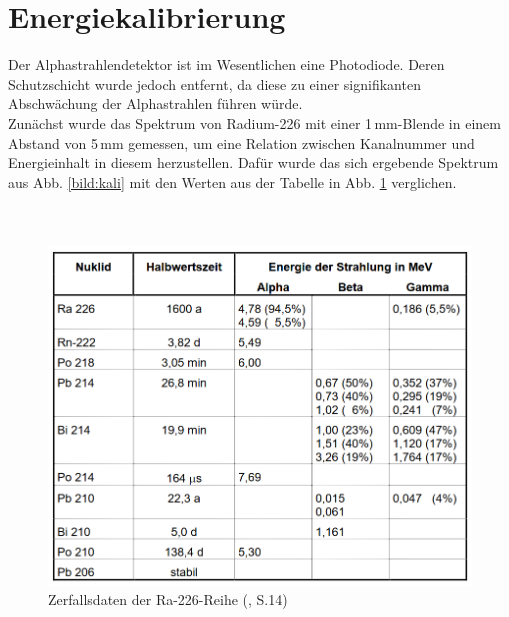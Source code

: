 


\section{Energiekalibrierung}
\label{subs:kali}

Der Alphastrahlendetektor ist im Wesentlichen eine Photodiode. Deren Schutzschicht wurde jedoch entfernt, da diese zu einer signifikanten 
Abschwächung der Alphastrahlen führen würde.\\
Zunächst wurde das Spektrum von Radium-226 mit einer 1\,mm-Blende in einem Abstand von 5\,mm gemessen, um eine Relation zwischen Kanalnummer 
und Energieinhalt in diesem herzustellen. Dafür wurde das sich ergebende Spektrum aus Abb. \ref{bild:kali} mit den Werten aus der 
Tabelle in Abb. \ref{bild:TabelleRa} verglichen.
\\
\\
\\

\begin{figure}[h]
    \centering
    \includegraphics[scale=0.5]{Bilder/TabelleRadium.png}
    \caption{Zerfallsdaten der Ra-226-Reihe (\cite{Kador2021}, S.14)} %
    \label{bild:TabelleRa}
\end{figure}

\clearpage

